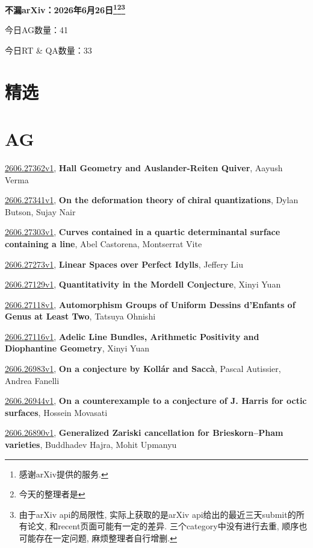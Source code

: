 \documentclass[9pt, a4paper]{article}
\theoremstyle{plain}
\theoremstyle{definition}
\theoremstyle{remark}
\newcommand{\arxiv}[3]{\href{https://arxiv.org/abs/#1}{#1}, \textbf{\textcolor{arxivblue}{#2}}, #3}
\newcommand{\AGnumber}{41}
\newcommand{\RTQAnumber}{33}
\newcommand{\NewestDate}{2026年6月26日}
\newcommand{\todayarXiver}{} %
\begin{document}
\begin{center}
    \Huge\textbf{不漏arXiv：\NewestDate\footnote{感谢arXiv提供的服务.}\footnote{今天的整理者是\todayarXiver}\footnote{由于arXiv api的局限性, 实际上获取的是arXiv api给出的最近三天submit的所有论文, 和recent页面可能有一定的差异. 三个category中没有进行去重, 顺序也可能存在一定问题, 麻烦整理者自行增删.}} \\
\end{center}

\setcounter{section}{-1}

\begin{center}
    今日AG数量：\AGnumber
    
    今日RT \& QA数量：\RTQAnumber
    
\end{center}


\section{精选}


\section{AG}
\arxiv{2606.27362v1}{Hall Geometry and Auslander-Reiten Quiver}{Aayush Verma}

\arxiv{2606.27341v1}{On the deformation theory of chiral quantizations}{Dylan Butson, Sujay Nair}

\arxiv{2606.27303v1}{Curves contained in a quartic determinantal surface containing a line}{Abel Castorena, Montserrat Vite}

\arxiv{2606.27273v1}{Linear Spaces over Perfect Idylls}{Jeffery Liu}

\arxiv{2606.27129v1}{Quantitativity in the Mordell Conjecture}{Xinyi Yuan}

\arxiv{2606.27118v1}{Automorphism Groups of Uniform Dessins d'Enfants of Genus at Least Two}{Tatsuya Ohnishi}

\arxiv{2606.27116v1}{Adelic Line Bundles, Arithmetic Positivity and Diophantine Geometry}{Xinyi Yuan}

\arxiv{2606.26983v1}{On a conjecture by Kollár and Saccà}{Pascal Autissier, Andrea Fanelli}

\arxiv{2606.26944v1}{On a counterexample to a conjecture of J. Harris for octic surfaces}{Hossein Movasati}

\arxiv{2606.26890v1}{Generalized Zariski cancellation for Brieskorn--Pham varieties}{Buddhadev Hajra, Mohit Upmanyu}
\end{document}

